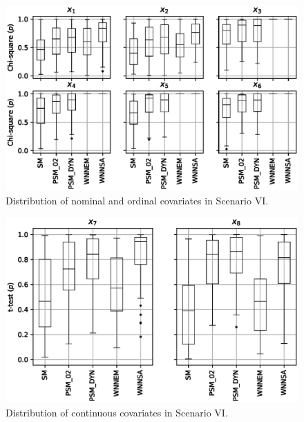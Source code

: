 		\begin{figure}[h]
			\centering
			\captionsetup{justification=centering}
			\includegraphics[width=\textwidth]{assets/figures/control_group_selection/wnnsa/scenVI/distribution_chi.eps}
			\caption{Distribution of nominal and ordinal covariates in Scenario VI. %
			}
			\label{fig:wnnsa_distribution_chi}    
		\end{figure}
										
		\begin{figure}[h]
			\centering
			\captionsetup{justification=centering}
			\includegraphics[width=.8\textwidth]{assets/figures/control_group_selection/wnnsa/scenVI/distribution_t.eps}
			\caption{Distribution of continuous covariates in Scenario VI.%
			}
			\label{fig:wnnsa_distribution_t}    
		\end{figure}
		
